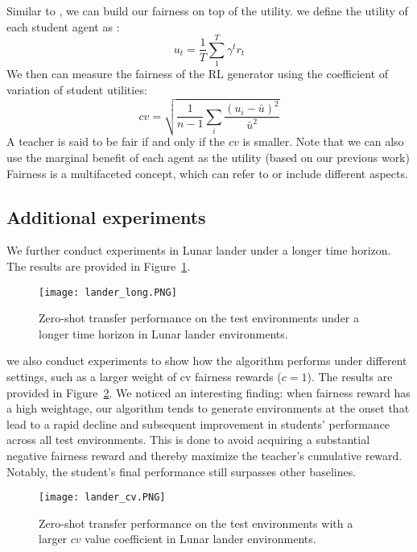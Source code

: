 \documentclass{article}
\begin{document}
Similar to \cite{elmalaki2021fair}, we can build our fairness on top of the utility. we define the utility of each student agent as :
\begin{equation}
    u_t=\frac{1}{T}\sum_{1}^T \gamma^t r_t
\end{equation}
We then can measure the fairness of the RL generator using the coefficient of variation of student utilities:
\begin{equation}
    cv = \sqrt{\frac{1}{n-1}\sum_i \frac{(u_i-\bar{u})^2}{\bar{u}^2}}
\end{equation}
A teacher is said to be fair if and only if the $cv$ is smaller. Note that we can also use the marginal benefit of each agent as the utility (based on our previous work)
Fairness is a multifaceted concept, which can refer to or include different aspects.


\subsection{Additional experiments}
We further conduct experiments in Lunar lander under a longer time horizon. The results are provided in Figure~\ref{fig:lander_long}.

\begin{figure}[th]
    \centering
    \texttt{[image: lander\_long.PNG]}
    \caption{Zero-shot transfer performance on the test environments under a longer time horizon in Lunar lander environments. }\label{fig:lander_long}
\end{figure}

we also conduct experiments to show how the algorithm performs under different settings, such as a larger weight of cv fairness rewards ($c=1$). The results are provided in Figure~\ref{fig:lander_cv}. We noticed an interesting finding: when fairness reward has a high weightage, our algorithm tends to generate environments at the onset that lead to a rapid decline and subsequent improvement in students' performance across all test environments. This is done to avoid acquiring a substantial negative fairness reward and thereby maximize the teacher's cumulative reward. Notably, the student's final performance still surpasses other baselines.
\begin{figure}[th]
    \centering
    \texttt{[image: lander\_cv.PNG]}
    \caption{Zero-shot transfer performance on the test environments with a larger $cv$ value coefficient in Lunar lander environments. }\label{fig:lander_cv}
\end{figure}
\end{document}
